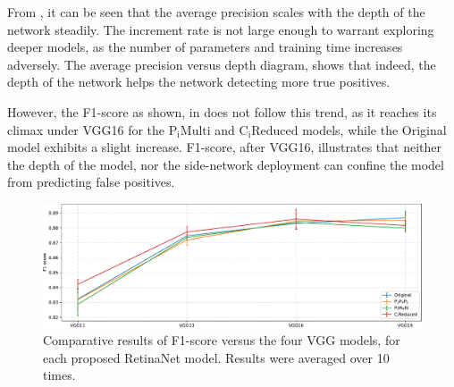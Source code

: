 From , it can be seen that the average precision scales with the depth of the network steadily. The increment rate is not large enough  to warrant exploring deeper models, as the number of parameters and training time increases adversely. The average precision versus depth diagram, shows that indeed, the depth of the network helps the network detecting more true positives. 

However, the F1-score as shown, in  does not follow this trend, as it reaches its climax under VGG16 for the $\text{P}_\text{i}\text{Multi}$ and $\text{C}_\text{i}\text{Reduced}$ models, while the Original model exhibits a slight increase.
F1-score, after VGG16, illustrates that neither the depth of the model, nor the side-network deployment can confine the model from predicting false positives.

\begin{figure}[!htb]
  \centering
  \includegraphics[width=\textwidth]{figures/ch3/fig8.pdf}
  \caption{Comparative results of F1-score versus the four VGG models, for each proposed RetinaNet model. Results were averaged over 10 times.}
  \label{fig8}
\end{figure}

\begin{table}[!htb]
  \centering
  \caption{Indicative values of F1-score for the selected four VGG models, for each proposed RetinaNet model (). Parentheses indicate the input resolution.}
  \label{tab4}
\end{table}

